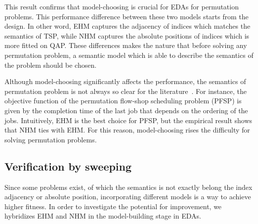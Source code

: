 This result confirms that model-choosing is crucial for EDAs for permutation problems. This performance difference between these two models starts from the design. In other word, EHM captures the adjacency of indices which matches the semantics of TSP, while NHM captures the absolute positions of indices which is more fitted on QAP. These differences makes the nature that before solving any permutation problem, a semantic model which is able to describe the semantics of the problem should be chosen.

Although model-choosing significantly affects the performance, the semantics of permutation problem is not always so clear for the literature~\citep{ceberio2012review}. For instance, the objective function of the permutation flow-shop scheduling problem (PFSP) is given by the completion time of the last job that depends on the ordering of the jobs. Intuitively, EHM is the best choice for PFSP, but the empirical result shows that NHM ties with EHM. For this reason, model-choosing rises the difficulty for solving permutation problems.



\subsection{Verification by sweeping}


Since some problems exist, of which the semantics is not exactly belong the index adjacency or absolute position, incorporating different models is a way to achieve higher fitness. In order to investigate the potential for improvement, we hybridizes EHM and NHM in the model-building stage in EDAs. 

